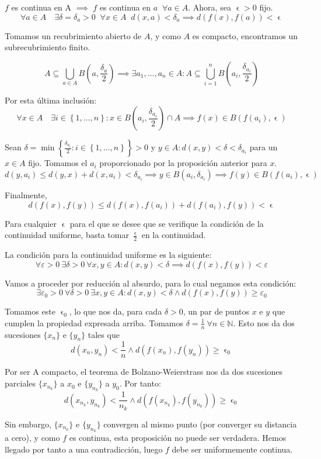 \documentclass[11pt, a4paper, titlepage]{article}
\makeatletter
\let\epsilon\upvarepsilon
\renewenvironment{proof}[1][\proofname] {\vspace{-15pt}\par\pushQED{\qed}\normalfont\topsep6\p@\@plus6\p@\relax\trivlist\item[\hskip\labelsep\it#1\@addpunct{.}]\ignorespaces}{\popQED\endtrivlist\@endpefalse}
\newcommand\ddfrac[2]{\frac{\displaystyle #1}{\displaystyle #2}}
\theoremstyle{theorem-style}
\theoremstyle{definition-style}
\theoremstyle{remark-style}
\theoremstyle{example-style}
\makeatother
\begin{document}
\begin{proof}
	$f$ es continua en A $\implies$ $f$ es continua en $a\;\; \forall a \in A$. Ahora, sea $\epsilon>0$ fijo.
	\[
	    \forall a \in A \quad \exists \delta = \delta_a > 0\;\; \forall x\in A\;\; d(x,a) < \delta_a \implies d(f(x),f(a))<\epsilon
	\]

	Tomamos un recubrimiento abierto de $A$, y como $A$ es compacto, encontramos un subrecubrimiento finito.
	
	\[
		A \subseteq \bigcup_{a\in A} B(a, \frac{\delta_a}{2}) \implies \exists a_1,\dots,a_n \in A: A \subseteq \bigcup_{i=1}^n B\left(a_i, \frac{\delta_{a_i}}{2}\right)
	\]
	
	Por esta última inclusión:
	\[
		\forall x\in A\quad \exists i \in \left \{ 1,\dots,n \right \} : x\in B\left(a_i,\frac{\delta_{a_i}}{2}\right)\cap A \implies f(x)\in B(f(a_i),\epsilon)
	\]
	
	Sean $\delta = \min\left\{\ddfrac{\delta_{a_i}}{2} : i \in \left \{ 1,\dots,n \right \}\right\} > 0$ y $y\in A : d(x,y) < \delta < \delta_{a_i}$ para un $x\in A$ fijo. Tomamos el $a_i$ proporcionado por la proposición anterior para $x$.
	\[
		d(y,a_i) \le d(y,x)+d(x,a_i) < \delta_{a_i} \implies y\in B(a_i,\delta_{a_i}) \implies f(y) \in B(f(a_i), \epsilon)
	\]
	
	Finalmente,
	\[
		d(f(x), f(y)) \le d(f(x),f(a_i)) + d(f(a_i), f(y)) < \epsilon
	\]
	
	Para cualquier $\epsilon$ para el que se desee que se verifique la condición de la continuidad uniforme, basta tomar $\ddfrac{\epsilon}{2}$ en la continuidad.
\end{proof}

\begin{proof}[Demostración alternativa]
	La condición para la continuidad uniforme es la siguiente:
	\[
		\forall \varepsilon > 0 \  \exists \delta > 0 \ \forall x, y \in A : d(x,y) < \delta \implies d (f(x) , f(y) ) < \varepsilon
	\]
	
	Vamos a proceder por reducción al absurdo, para lo cual negamos esta condición:
	\[
		\exists \varepsilon_0 > 0 \ \forall \delta > 0 \ \exists x, y \in A : d (x,y) < \delta \wedge d (f(x) , f(y) ) \ge \varepsilon_0
	\]
	
	Tomamos este $\epsilon_0$, lo que nos da, para cada $\delta>0$, un par de puntos $x$ e $y$ que cumplen la propiedad expresada arriba. Tomamos $\delta = \frac{1}{n} \ \forall n\in \mathbb{N}$. Esto nos da dos sucesiones $\{x_n\}$ e $\{y_n\}$ tales que
	\[
		d(x_n,y_n) < \frac{1}{n} \wedge d(f(x_n),f(y_n)) \ge \epsilon_0
	\]
	
	Por ser A compacto, el teorema de Bolzano-Weierstrass nos da dos sucesiones parciales $\{x_{n_k}\}$ a $x_0$ e $\{y_{n_k}\}$ a $y_0$. Por tanto:
	\[
		d(x_{n_k},y_{n_k}) < \frac{1}{n_k} \wedge d(f(x_{n_k}),f(y_{n_k})) \ge \epsilon_0
	\]
	
	Sin embargo, $\{x_{n_k}\}$ e $\{y_{n_k}\}$ convergen al mismo punto (por converger su distancia a cero), y como $f$ es continua, esta proposición no puede ser verdadera. Hemos llegado por tanto a una contradicción, luego $f$ debe ser uniformemente continua.
\end{proof}
\end{document}
